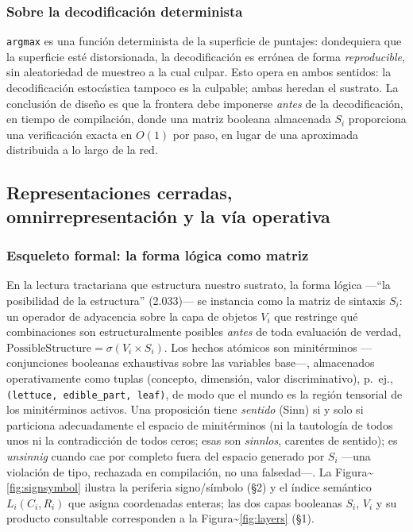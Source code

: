 \documentclass{article}
\begin{document}
\hypertarget{sobre-la-decodificaciuxf3n-determinista}{%
\subsubsection{Sobre la decodificación
determinista}\label{sobre-la-decodificaciuxf3n-determinista}}

\texttt{argmax} es una función determinista de la superficie de
puntajes: dondequiera que la superficie esté distorsionada, la
decodificación es errónea de forma \emph{reproducible}, sin aleatoriedad
de muestreo a la cual culpar. Esto opera en ambos sentidos: la
decodificación estocástica tampoco es la culpable; ambas heredan el
sustrato. La conclusión de diseño es que la frontera debe imponerse
\emph{antes} de la decodificación, en tiempo de compilación, donde una
matriz booleana almacenada \(S_i\) proporciona una verificación exacta
en \(O(1)\) por paso, en lugar de una aproximada distribuida a lo largo
de la red.

\hypertarget{representaciones-cerradas-omnirrepresentaciuxf3n-y-la-vuxeda-operativa}{%
\subsection{\texorpdfstring{Representaciones cerradas,
omnirrepresentación y la vía operativa
\label{app:repr}}{Representaciones cerradas, omnirrepresentación y la vía operativa }}\label{representaciones-cerradas-omnirrepresentaciuxf3n-y-la-vuxeda-operativa}}

\hypertarget{esqueleto-formal-la-forma-luxf3gica-como-matriz}{%
\subsubsection{Esqueleto formal: la forma lógica como
matriz}\label{esqueleto-formal-la-forma-luxf3gica-como-matriz}}

En la lectura tractariana que estructura nuestro sustrato, la forma
lógica ---``la posibilidad de la estructura'' (2.033)--- se instancia
como la matriz de sintaxis \(S_i\): un operador de adyacencia sobre la
capa de objetos \(V_i\) que restringe qué combinaciones son
estructuralmente posibles \emph{antes} de toda evaluación de verdad,
\(\text{PossibleStructure} = \sigma(V_i \times S_i)\). Los hechos
atómicos son minitérminos ---conjunciones booleanas exhaustivas sobre
las variables base---, almacenados operativamente como tuplas (concepto,
dimensión, valor discriminativo), p.~ej.,
\texttt{(lettuce,\ edible\_part,\ leaf)}, de modo que el mundo es la
región tensorial de los minitérminos activos. Una proposición tiene
\emph{sentido} (Sinn) si y solo si particiona adecuadamente el espacio
de minitérminos (ni la tautología de todos unos ni la contradicción de
todos ceros; esas son \emph{sinnlos}, carentes de sentido); es
\emph{unsinnig} cuando cae por completo fuera del espacio generado por
\(S_i\) ---una violación de tipo, rechazada en compilación, no una
falsedad---. La Figura\textasciitilde{}\ref{fig:signsymbol} ilustra la
periferia signo/símbolo (\S2) y el índice semántico \(L_i(C_i,R_i)\) que
asigna coordenadas enteras; las dos capas booleanas \(S_i\), \(V_i\) y
su producto consultable corresponden a la
Figura\textasciitilde{}\ref{fig:layers} (\S1).
\end{document}
